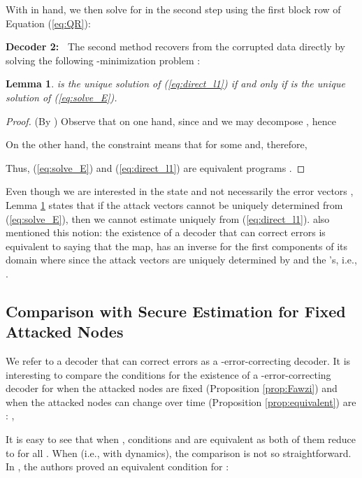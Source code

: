 \documentclass[journal]{IEEEtran}
\newtheorem{lem}{\bf{Lemma}}
\begin{document}
With  in hand, we then solve for  in the second step using the first block row of Equation (\ref{eq:QR}):


\noindent
{\bf Decoder 2:~} 
The second method recovers  from the corrupted data  directly by solving the following -minimization problem \cite{Candes_Tao}:


\begin{lem} \label{lem:equivalent}
  is the unique solution of (\ref{eq:direct_l1}) if and only if  is the unique solution of (\ref{eq:solve_E}).
\end{lem}
\begin{proof} (By \cite{Candes_Tao}) Observe that on one hand, since  and we may decompose , hence 

On the other hand, the constraint  means that  for some  and, therefore,

Thus, (\ref{eq:solve_E}) and (\ref{eq:direct_l1}) are equivalent programs \cite{Candes_Tao}.
\end{proof}
\noindent Even though we are interested in the state  and not necessarily the error vectors , Lemma \ref{lem:equivalent} states that if the attack vectors cannot be uniquely determined from (\ref{eq:solve_E}), then we cannot estimate  uniquely from (\ref{eq:direct_l1}). \cite{Fawzi2014} also mentioned this notion: the existence of a decoder that can correct  errors is equivalent to saying that the map,  has an inverse for the first  components of its domain where  since the attack vectors are uniquely determined by  and the 's, i.e., . 






\subsection{Comparison with Secure Estimation for Fixed Attacked Nodes}
We refer to a decoder that can correct  errors as a -error-correcting decoder.
It is interesting to compare the conditions for the existence of a -error-correcting decoder for when the attacked nodes are fixed (Proposition \ref{prop:Fawzi}) and when the attacked nodes can change over time (Proposition \ref{prop:equivalent}) are :
,

It is easy to see that when , conditions  and  are equivalent as both of them reduce to  for all .
When  (i.e., with dynamics), the comparison is not so straightforward. In \cite{Fawzi2014}, the authors proved an equivalent condition for :
\end{document}
